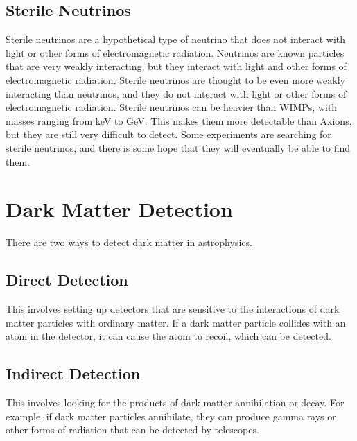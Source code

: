 \documentclass[10pt, oneside]{book}
\numberwithin{equation}{chapter}
\begin{document}
\subsection{Sterile Neutrinos}
Sterile neutrinos are a hypothetical type of neutrino that does not interact with light or other forms of electromagnetic radiation. Neutrinos are known particles that are very weakly interacting, but they interact with light and other forms of electromagnetic radiation. Sterile neutrinos are thought to be even more weakly interacting than neutrinos, and they do not interact with light or other forms of electromagnetic radiation.
Sterile neutrinos can be heavier than WIMPs, with masses ranging from keV to GeV. This makes them more detectable than Axions, but they are still very difficult to detect. Some experiments are searching for sterile neutrinos, and there is some hope that they will eventually be able to find them.

\section{Dark Matter Detection}
There are two ways to detect dark matter in astrophysics.
\subsection{Direct Detection}
This involves setting up detectors that are sensitive to the interactions of dark matter particles with ordinary matter. If a dark matter particle collides with an atom in the detector, it can cause the atom to recoil, which can be detected.
\subsection{Indirect Detection}
This involves looking for the products of dark matter annihilation or decay. For example, if dark matter particles annihilate, they can produce gamma rays or other forms of radiation that can be detected by telescopes.
\end{document}
